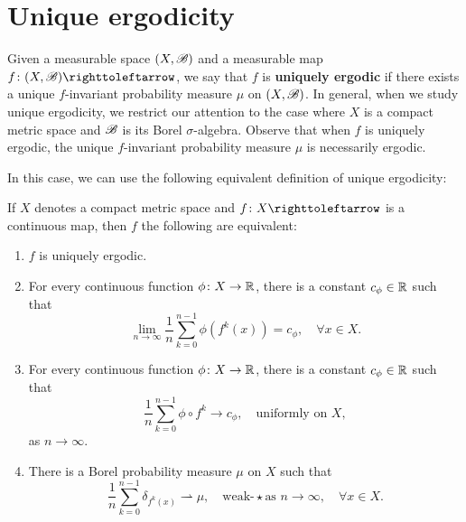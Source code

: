 
\section{Unique ergodicity}\label{sec:unique-ergodicity}

Given a measurable space $(X,\mathscr{B})$ and a measurable map $f\colon (X,\B)\carr$, we say that $f$ is \textbf{uniquely ergodic} if there exists a unique $f$-invariant probability measure $\mu$ on $(X,\mathscr{B})$. In general, when we study unique ergodicity, we restrict our attention to the case where $X$ is a compact metric space and $\mathscr{B}$ is its Borel $\sigma$-algebra. Observe that when $f$ is uniquely ergodic, the unique $f$-invariant probability measure $\mu$ is necessarily ergodic.

In this case, we can use the following equivalent definition of unique ergodicity:

\begin{theorem}
  If $X$ denotes a compact metric space and $f\colon X\carr$ is a continuous map, then $f$ the following are equivalent:
  \begin{enumerate}
    \item $f$ is uniquely ergodic.
    \item For every continuous function $\phi\colon X\to\mathbb{R}$, there is a constant $c_\phi\in\mathbb{R}$ such that
          \begin{displaymath}
            \lim_{n\to\infty}\frac{1}{n}\sum_{k=0}^{n-1}\phi(f^k(x))=c_\phi, \quad\forall x\in X.
          \end{displaymath}
    \item For every continuous function $\phi\colon X\to\mathbb{R}$, there is a constant $c_\phi\in\mathbb{R}$ such that
          \begin{displaymath}
            \frac{1}{n}\sum_{k=0}^{n-1}\phi\circ f^k\to c_\phi, \quad\text{uniformly on }X,
          \end{displaymath}
          as $n\to\infty$.
    \item There is a Borel probability measure $\mu$ on $X$ such that
          \begin{displaymath}
            \frac{1}{n}\sum_{k=0}^{n-1}\delta_{f^k(x)}\rightharpoonup\mu, \quad\text{weak-}\star \text{as }n\to\infty,\quad\forall x\in X.
          \end{displaymath}
\end{enumerate}
\end{theorem}

